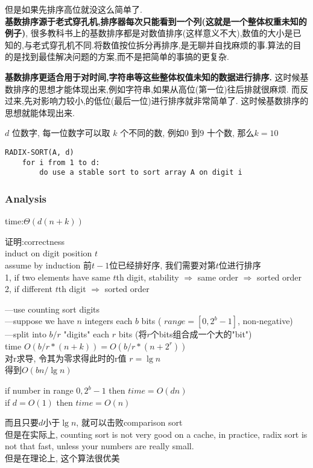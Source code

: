 \documentclass{article}
\begin{document}
但是如果先排序高位就没这么简单了.\\
\textbf{基数排序源于老式穿孔机,排序器每次只能看到一个列(这就是一个整体权重未知的例子)},
很多教科书上的基数排序都是对数值排序(这样意义不大),数值的大小是已知的,与老式穿孔机不同.将数值按位拆分再排序,是无聊并自找麻烦的事.算法的目的是找到最佳解决问题的方案,而不是把简单的事搞的更复杂.

\textbf{基数排序更适合用于对时间,字符串等这些整体权值未知的数据进行排序.}
这时候基数排序的思想才能体现出来,例如字符串,如果从高位(第一位)往后排就很麻烦.
而反过来,先对影响力较小,的低位(最后一位)进行排序就非常简单了.
这时候基数排序的思想就能体现出来.

$d$ 位数字, 每一位数字可以取 $k$ 个不同的数, 例如$0$ 到$9$ 十个数, 那么$k=10$
\begin{verbatim}
RADIX-SORT(A, d)
    for i from 1 to d:
        do use a stable sort to sort array A on digit i
\end{verbatim}

\subsubsection{Analysis}
time:$\Theta(d(n+k))$

证明:correctness\\
induct on digit position $t$\\
assume by induction 前$t-1$位已经排好序, 我们需要对第$t$位进行排序\\
1, if two elements have same $t$th digit, stability $\Rightarrow$ same order $\Rightarrow$ sorted order\\
2, if different $t$th digit $\Rightarrow$ sorted order

---use counting sort digits\\
---suppose we have $n$ integers each $b$ bits ( $range=[0,2^b-1]$, non-negative)\\
---split into $b/r$ "digits" each $r$ bits (将$r$个bits组合成一个大的"bit")\\
time $O(b/r*(n+k))=O(b/r*(n+2^r))$\\
对r求导, 令其为零求得此时的r值 $r=\lg n$\\
得到$O(bn/\lg n )$

if number in range $0,2^b-1$ then $time = O(dn)$\\
if  $d=O(1)$ then $time=O(n)$

而且只要$d$小于$\lg n$, 就可以击败comparison sort\\
但是在实际上, counting sort is not very good on a cache, in practice, radix sort is not that fast, unless your numbers are really small.\\
但是在理论上, 这个算法很优美
\end{document}

